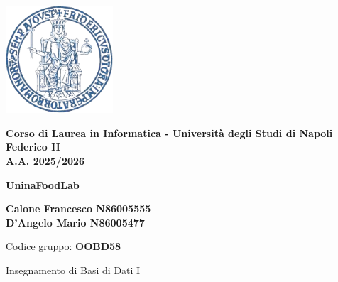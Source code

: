 \documentclass[11pt]{article}
\begin{document}
\thispagestyle{firstpage}


\begin{center}
    \includegraphics[width=0.3\textwidth]{latex/immagini/uni_logo.png} 
    \vspace{0.5cm}

    {\large \textbf{Corso di Laurea in Informatica - Università degli Studi di Napoli Federico II}}\\
    {\large \textbf{A.A. 2025/2026}}\\[1cm]
    \vspace{1cm}

    {\Huge \color{myblue} \textbf{UninaFoodLab}}\\[2cm]

    \begin{flushleft}
    \centering
    {\large
    \textbf{Calone Francesco N86005555}\\
    \vspace{0.2cm}
    \textbf{D'Angelo Mario N86005477}\\
    }
    
    \vspace{0.2cm}
    {\small Codice gruppo: \textbf{OOBD58}}\\
    \vspace{0.8cm} 

    {\small Insegnamento di Basi di Dati I}
    \end{flushleft}
\end{center}


\newpage

\pagestyle{normal}

\tableofcontents
\thispagestyle{normal}











\end{document}
